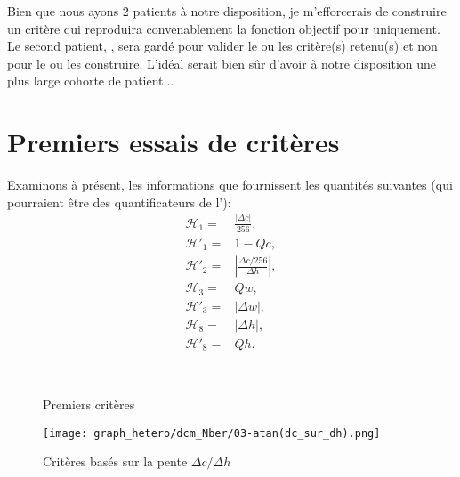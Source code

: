 \documentclass[main.tex]{subfiles}
\begin{document}
Bien que nous ayons 2 patients à notre disposition, je m'efforcerais de construire un critère qui reproduira convenablement la fonction objectif pour \Nber uniquement. Le second patient, \Chen, sera gardé pour valider le ou les critère(s) retenu(s) et non pour le ou les construire. L'idéal serait bien sûr d'avoir à notre disposition une plus large cohorte de patient...

\section{Premiers essais de critères\label{sec:premier_essai_critere}}
Examinons à présent, les informations que fournissent les quantités suivantes (qui pourraient être des quantificateurs de l'\hetero):
\begin{align}
\mathcal{H}_1 =& \frac{|\Delta c |}{256}, \\
\mathcal{H}'_1 =& 1-Qc, \\ %
\mathcal{H}'_2 =& \left| \frac{\Delta c / 256 }{\Delta h}\right|, \\
\mathcal{H}_3 =& Qw, \\ %
\mathcal{H}'_3 =& |\Delta w|, \\
\mathcal{H}_8 =& |\Delta h|, \\
\mathcal{H}'_8 =& Qh. %
\end{align}

\begin{figure}[htpb]
\\
\centering
{}
\caption{\label{fig:premiers_criteres}Premiers critères}
\end{figure}
\begin{figure}[htpb]
\centering
\texttt{[image: graph\_hetero/dcm\_Nber/03-atan(dc\_sur\_dh).png]}
\caption{\label{fig:critere_dc_sur_dh}Critères basés sur la pente $\Delta c / \Delta h$}
\end{figure}
\end{document}
